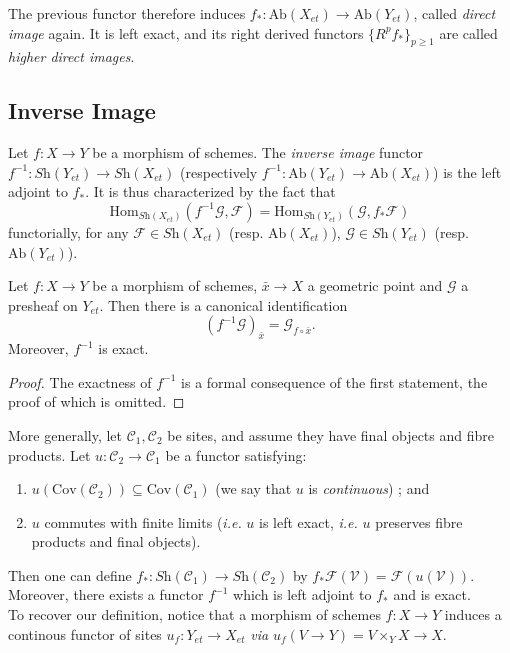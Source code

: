 \begin{definition}
The previous functor therefore induces $f_*:\text{Ab}(X_{et})\to \text{Ab}(Y_{et})$, called \emph{direct image} again. It is left exact, and its right derived functors $\{R^pf_*\}_{p \geq 1}$ are called \emph{higher direct images}.  
\end{definition}
	
\subsection{Inverse Image}

\begin{definition}
Let $f: X\to Y$ be a morphism of schemes. The \emph{inverse image} functor  $f^{-1} : \textit{Sh}(Y_{et})\to \textit{Sh}(X_{et})$ (respectively $f^{-1}: \text{Ab}(Y_{et}) \to \text{Ab}(X_{et})$) is the left adjoint to $f_*$. It is thus characterized by the fact that 
$$
\text{Hom}_{{\textit{Sh}(X_{et})}} (f^{-1}\mathcal{G}, \mathcal{F}) = \text{Hom}_{\textit{Sh}(Y_{et})} (\mathcal{G}, f_*\mathcal{F}) 
$$
functorially, for any $\mathcal{F} \in \textit{Sh}(X_{et})$ (resp. $\text{Ab}(X_{et})$), $\mathcal{G} \in \textit{Sh}(Y_{et})$ (resp. $\text{Ab}(Y_{et})$).
\end{definition}

\begin{lemma} 
Let $f : X \to Y$ be a morphism of schemes, $\bar x \to X$ a geometric point and $\mathcal{G}$ a presheaf on $Y_{et}$. Then there is a canonical identification 
$$
\left(f^{-1}\mathcal{G}\right)_{\bar x} = \mathcal{G}_{f\circ \bar x}.
$$
Moreover, $f^{-1}$ is exact.
\end{lemma}

\begin{proof}
The exactness of $f^{-1}$ is a formal consequence of the first statement, the proof of which is omitted.
\end{proof}
	
\begin{remark}
More generally, let $\mathcal{C}_1, \mathcal{C}_2$ be sites, and assume they have final objects and fibre products.  Let  $u: \mathcal{C}_2 \to \mathcal{C}_1$ be a functor satisfying:
\begin{enumerate}
\item $u (\text{Cov}(\mathcal{C}_2)) \subseteq \text{Cov}(\mathcal{C}_1)$ (we say that $u$ is \emph{continuous}) ; and
\item $u$ commutes with finite limits ({\it i.e.} $u$ is left exact, {\it i.e.} $u$ preserves fibre products and final objects).
\end{enumerate}
Then one can define $f_*: \textit{Sh}(\mathcal{C}_1) \to \textit{Sh}(\mathcal{C}_2)$ by $ f_* \mathcal{F}(\mathcal{V}) = \mathcal{F}(u(\mathcal{V}))$. Moreover, there exists a functor $f^{-1}$ which is left adjoint to $f_*$ and is exact.
\\
To recover our definition, notice that a morphism of schemes $ f: X  \to Y$ induces a continous functor of sites $u_f: Y_{et} \to X_{et}$ {\it via} $u_f (V \to Y) = V \times_Y X \to X$.
\end{remark} %
